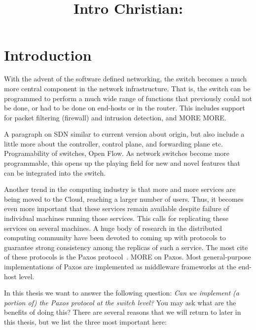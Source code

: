 \documentclass{article}
\title{Intro Christian:}
\begin{document}
\section{Introduction}

With the advent of the software defined networking, the switch becomes a
much more central component in the network infrastructure. That is, the
switch can be programmed to perform a much wide range of functions that
previously could not be done, or had to be done on end-hosts or in the
router. This includes support for packet filtering (firewall) and intrusion
detection, and MORE MORE.

A paragraph on SDN similar to current version about origin, but also include
a little more about the controller, control plane, and forwarding plane etc.
Programability of switches, Open Flow.
%
As network switches become more programmable, this opens up the playing
field for new and novel features that can be integrated into the switch. 

Another trend in the computing industry is that more and more services are
being moved to the Cloud, reaching a larger number of users. Thus, it
becomes even more important that these services remain available despite
failure of individual machines running those services. This calls for
replicating these services on several machines. A huge body of research in
the distributed computing community have been devoted to coming up with
protocols to guarantee strong consistency among the replicas of such a
service. The most cite of these protocols is the Paxos protocol~\cite{pms}. 
%
MORE on Paxos. Most general-purpose implementations of Paxos are implemented
as middleware frameworks at the end-host level.

In this thesis we want to answer the following question: \emph{Can we
  implement (a portion of) the Paxos protocol at the switch level?}
%
You may ask what are the benefits of doing this? There are several reasons
that we will return to later in this thesis, but we list the three most
important here:
\end{document}
